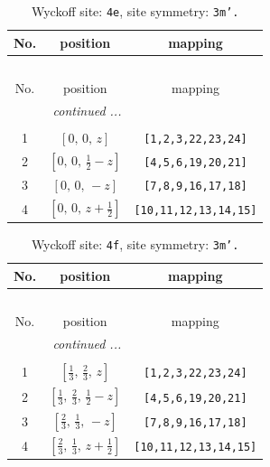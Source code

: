 \documentclass[fleqn,8pt]{jsarticle}
\begin{document}
\begin{longtable}{ccc}
\caption{Wyckoff site: {\tt 4e}, site symmetry: {\tt 3m'.}}
 \\
 \hline \hline
No. & position & mapping \\ \hline \endfirsthead

\multicolumn{2}{l}{\tablename\ \thetable{}} \\
 \hline \hline
No. & position & mapping \\ \hline \endhead

 \hline \hline
\multicolumn{2}{r}{\footnotesize\it continued ...} \\ \endfoot

 \hline \hline
\multicolumn{2}{r}{} \\ \endlastfoot

1 & $\left[ 0,\, 0,\, z \right]$ & {\tt [1,2,3,22,23,24]} \\ \hline
2 & $\left[ 0,\, 0,\, \frac{1}{2} - z \right]$ & {\tt [4,5,6,19,20,21]} \\ \hline
3 & $\left[ 0,\, 0,\, - z \right]$ & {\tt [7,8,9,16,17,18]} \\ \hline
4 & $\left[ 0,\, 0,\, z + \frac{1}{2} \right]$ & {\tt [10,11,12,13,14,15]} \\
\end{longtable}
\renewcommand{\arraystretch}{1.2}
\begin{longtable}{ccc}
\caption{Wyckoff site: {\tt 4f}, site symmetry: {\tt 3m'.}}
 \\
 \hline \hline
No. & position & mapping \\ \hline \endfirsthead

\multicolumn{2}{l}{\tablename\ \thetable{}} \\
 \hline \hline
No. & position & mapping \\ \hline \endhead

 \hline \hline
\multicolumn{2}{r}{\footnotesize\it continued ...} \\ \endfoot

 \hline \hline
\multicolumn{2}{r}{} \\ \endlastfoot

1 & $\left[ \frac{1}{3},\, \frac{2}{3},\, z \right]$ & {\tt [1,2,3,22,23,24]} \\ \hline
2 & $\left[ \frac{1}{3},\, \frac{2}{3},\, \frac{1}{2} - z \right]$ & {\tt [4,5,6,19,20,21]} \\ \hline
3 & $\left[ \frac{2}{3},\, \frac{1}{3},\, - z \right]$ & {\tt [7,8,9,16,17,18]} \\ \hline
4 & $\left[ \frac{2}{3},\, \frac{1}{3},\, z + \frac{1}{2} \right]$ & {\tt [10,11,12,13,14,15]} \\
\end{longtable}
\end{document}
